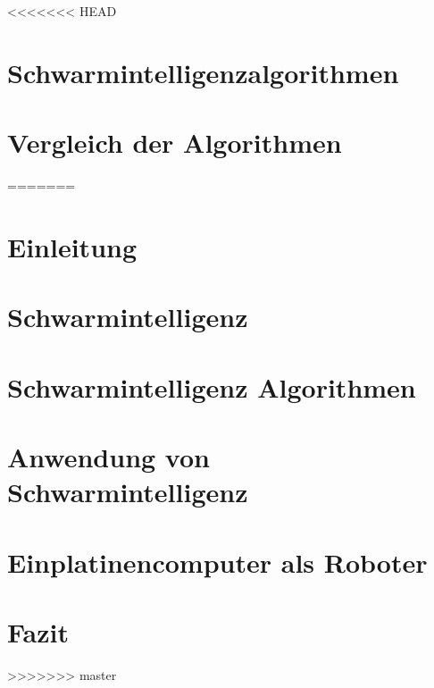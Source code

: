 \documentclass[12pt, a4paper]{report}
\begin{document}

<<<<<<< HEAD
\chapter{Schwarmintelligenzalgorithmen}

\chapter{Vergleich der Algorithmen}

=======

\tableofcontents
\listoffigures
\listoftables
\listoflistings
\chapter{Einleitung}

\chapter{Schwarmintelligenz}

\chapter{Schwarmintelligenz Algorithmen}

\chapter{Anwendung von Schwarmintelligenz}

\chapter{Einplatinencomputer als Roboter}

\chapter{Fazit}


>>>>>>> master
\printbibliography
\end{document}
